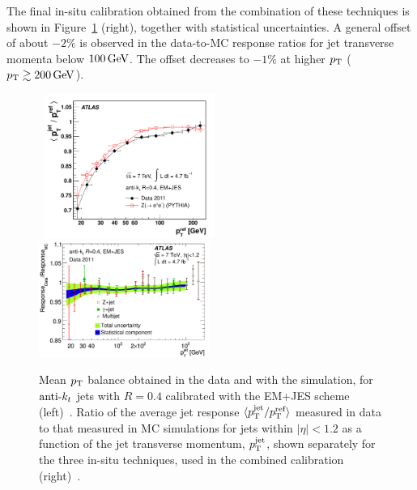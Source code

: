 The final in-situ calibration obtained from the combination of these techniques is shown in Figure~\ref{fig:JetInSituMeasurements} (right), together with statistical uncertainties.
A general offset of about $-2\%$ is observed in the data-to-MC response ratios for jet transverse momenta below $\unit[100]{GeV}$.
The offset decreases to $-1\%$ at higher $\pt$ ($\pt \gtrsim \unit[200]{GeV}$).

\begin{figure}[!ht]
  \begin{center}
    \mbox{
      \includegraphics[width=0.495\textwidth]{ObjectReconstruction/Figures/Zjetfigures_balanceComparison_Jes_Akt4.pdf}
      \includegraphics[width=0.495\textwidth]{ObjectReconstruction/Figures/responseRatioSmooth_TSpline2_EMJES_R4.pdf}
    }
  \end{center}
  \caption[Mean $\pt$ balance obtained in the data and with the \pythia{} simulation, and ratio of the average jet response measured in data to that measured in MC simulations.]{Mean $\pt$ balance obtained in the data and with the \pythia{} simulation, for $\hbox{anti-${k_t}$}$ jets with $R=0.4$ calibrated with the EM+JES scheme (left)~\cite{Aad:2014bia}. Ratio of the average jet response $\langle p_{\mathrm{T}}^{\text{jet}} / p_{\mathrm{T}}^{\text{ref}} \rangle$ measured in data to that measured in MC simulations for jets within $|\eta|<1.2$ as a function of the jet transverse momentum, $p_{\mathrm{T}}^{\text{jet}}$, shown separately for the three in-situ techniques, used in the combined calibration (right)~\cite{Aad:2014bia}.}
  \label{fig:JetInSituMeasurements}
\end{figure}

